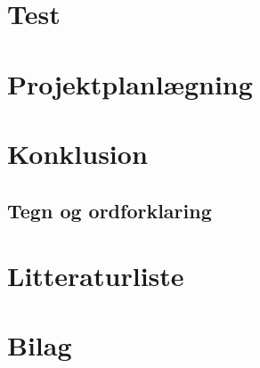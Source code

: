 \documentclass[12pt,oneside,a4paper,english]{article}
\begin{document}
\newpage
\section{Test}

\thispagestyle{fancy}

\newpage
\section{Projektplanlægning}

\thispagestyle{fancy}


\newpage
\section{Konklusion}

\thispagestyle{fancy}

\newpage
\begin{flushleft}
\section{Tegn og ordforklaring}
\end{flushleft}

\thispagestyle{fancy}


\newpage
\section{Litteraturliste}



\newpage
\section{Bilag}
\label{endOfText}
\label{endOfDoc}
\end{document}
